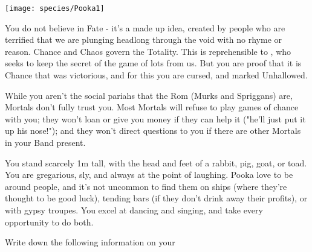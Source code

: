 


\begin{center}
\texttt{[image: species/Pooka1]}
\end{center}



\begin{multicols*}{2}\raggedcolumns

    
  You do not believe in Fate - it's a made up idea, created by people who are terrified that we are plunging headlong through the void with no rhyme or reason.  Chance and Chaos govern the Totality.  This is reprehensible to \TheAuthority, who seeks to keep the secret of the game of lots from us.  But you are proof that it is Chance that was victorious, and for this you are cursed, and marked Unhallowed.

    While you aren't the social pariahs that the Rom (Murks and Spriggans) are, Mortals don't fully trust you.  Most Mortals will refuse to play games of chance with you; they won't loan or give you money if they can help it ("he'll just put it up his nose!"); and they won't direct questions to you if there are other Mortals in your Band present.

  You stand scarcely 1m tall, with the head and feet of a rabbit, pig, goat, or toad.  You are gregarious, sly, and always at the point of laughing.  Pooka love to be around people, and it's not uncommon to find them on ships (where they're thought to be good luck), tending bars (if they don't drink away their profits), or with gypsy troupes.  You excel at dancing and singing, and take every opportunity to do both.




\newpage


  Write down the following information on your 


\end{multicols*}
